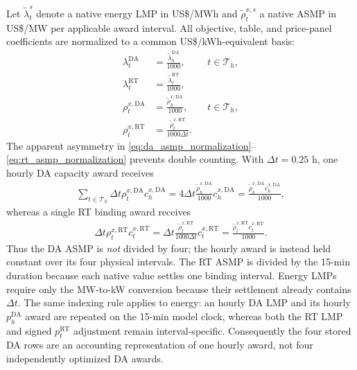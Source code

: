 \documentclass[final,5p,times]{elsarticle}
\newcommand{\dt}{\Delta t}
\newcommand{\DA}{\mathrm{DA}}
\newcommand{\RT}{\mathrm{RT}}
\newcommand{\calT}{\mathcal{T}}
\begin{document}
Let $\widetilde\lambda_t^s$ denote a native energy LMP in US\$/MWh and
$\widetilde\rho_t^{x,s}$ a native ASMP in US\$/MW per applicable award
interval. All objective, table, and price-panel coefficients are normalized to
a common US\$/kWh-equivalent basis:
\begin{align}
\lambda_t^{\DA}&=\frac{\widetilde\lambda_h^{\DA}}{1000},
&&t\in\calT_h,\\
\lambda_t^{\RT}&=\frac{\widetilde\lambda_t^{\RT}}{1000},
&& \label{eq:lmp_normalization}\\
\rho_t^{x,\DA}&=\frac{\widetilde\rho_h^{x,\DA}}{1000},
&&t\in\calT_h, \label{eq:da_asmp_normalization}\\
\rho_t^{x,\RT}&=\frac{\widetilde\rho_t^{x,\RT}}{1000\dt}.
&& \label{eq:rt_asmp_normalization}
\end{align}
The apparent asymmetry in \eqref{eq:da_asmp_normalization}--
\eqref{eq:rt_asmp_normalization} prevents double counting. With $\dt=0.25$ h,
one hourly DA capacity award receives
\begin{align}
\sum_{t\in\calT_h}\dt\rho_t^{x,\DA}c_h^{x,\DA}
=4\dt\frac{\widetilde\rho_h^{x,\DA}}{1000}c_h^{x,\DA}
=\frac{\widetilde\rho_h^{x,\DA}c_h^{x,\DA}}{1000},
\label{eq:da_capacity_payment_check}
\end{align}
whereas a single RT binding award receives
\begin{align}
\dt\rho_t^{x,\RT}c_t^{x,\RT}
=\dt\frac{\widetilde\rho_t^{x,\RT}}{1000\dt}c_t^{x,\RT}
=\frac{\widetilde\rho_t^{x,\RT}c_t^{x,\RT}}{1000}.
\label{eq:rt_capacity_payment_check}
\end{align}
Thus the DA ASMP is \emph{not} divided by four; the hourly award is instead
held constant over its four physical intervals. The RT ASMP is divided by the
15-min duration because each native value settles one binding interval. Energy
LMPs require only the MW-to-kW conversion because their settlement already
contains $\dt$. The same indexing rule applies to energy: an hourly DA LMP and
its hourly $p_h^{\DA}$ award are repeated on the 15-min model clock, whereas
both the RT LMP and signed $p_t^{\RT}$ adjustment remain interval-specific.
Consequently the four stored DA rows are an accounting representation of one
hourly award, not four independently optimized DA awards.
\end{document}
